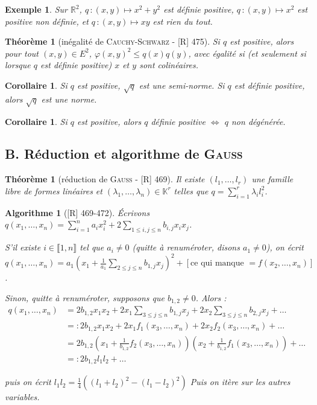 \documentclass[10pt, a4paper, parskip=full, twoside, twocolumn]{report}
\newtheorem{theorem}[definition]{Théorème}
\newtheorem{corollary}[definition]{Corollaire}
\newtheorem{example}[definition]{Exemple}
\newtheorem{algorithm}[definition]{Algorithme}
\newcommand{\IK}{\mathbb{K}}
\newcommand{\IR}{\mathbb{R}}
\begin{document}
\begin{example}
	Sur $\IR^2$, $q\,\colon (x,y)\mapsto x^2+y^2$ est définie positive, $q\,\colon(x,y)\mapsto x^2$ est positive non définie, et $q\,\colon(x,y)\mapsto xy$ est rien du tout.
\end{example}

\begin{theorem}[inégalité de \textsc{Cauchy-Schwarz} - \textnormal{[R] 475}]
	Si $q$ est positive, alors pour tout $(x,y)\in E^2$, $\varphi(x,y)^2 \leq q(x)q(y)$, avec égalité si (et seulement si lorsque $q$ est définie positive) $x$ et $y$ sont colinéaires.
\end{theorem}

\begin{corollary}
	Si $q$ est positive, $\sqrt{q}$ est une semi-norme.
	Si $q$ est définie positive, alors $\sqrt{q}$ est une norme.
\end{corollary}

\begin{corollary}
	Si $q$ est positive, alors $q$ définie positive $\iff$ $q$ non dégénérée.
\end{corollary}

\subsection*{B. Réduction et algorithme de \textsc{Gauss}}

\begin{theorem}[réduction de \textsc{Gauss} - \textnormal{[R] 469}]
	Il existe $(l_1,\dots, l_r)$ une famille libre de formes linéaires et $(\lambda_1,\dots,\lambda_n)\in\IK^r$ telles que $q = \sum_{i=1}^{r} \lambda_il_i^2$.
\end{theorem}

\begin{algorithm}[\textnormal{[R] 469-472}]
	Écrivons $q(x_1,\dots,x_n) = \sum_{i=1}^{n} a_ix_i^2 + 2\sum_{1\leq i,j\leq n} b_{i,j}x_ix_j$.
	
	S'il existe $i\in \llbracket 1,n \rrbracket$ tel que $a_i\neq 0$ (quitte à renuméroter, disons $a_1\neq 0$),
	on écrit $q(x_1,\dots, x_n) = a_1\left(x_1 + \frac{1}{a_1}\sum_{2\leq j \leq n}b_{1,j}x_j\right)^2 + [\text{ce qui manque } = f(x_2,\dots, x_n)]$.

	Sinon, quitte à renuméroter, supposons que $b_{1,2}\neq 0$. Alors :
	\begin{align*}
		q(x_1,\dots,x_n) &= 2b_{1,2}x_1x_2 + 2x_1\sum_{3\leq j\leq n}b_{1,j}x_j + 2x_2\sum_{3\leq j\leq n}b_{2,j}x_j +\dots \\	
		&=: 2b_{1,2}x_1x_2 + 2x_1f_1(x_3,\dots,x_n) + 2x_2f_2(x_3,\dots, x_n) + \dots \\
		&= 2b_{1,2}(x_1 + \frac{1}{b_{1,2}}f_2(x_3,\dots, x_n))(x_2 + \frac{1}{b_{1,2}}f_1(x_3,\dots, x_n)) + \dots \\
		&=: 2b_{1,2}l_1l_2 + \dots
	\end{align*}

	puis on écrit $l_1l_2 = \frac{1}{4}\left((l_1+l_2)^2 - (l_1-l_2)^2\right)$
	Puis on itère sur les autres variables.
\end{algorithm}
\end{document}
